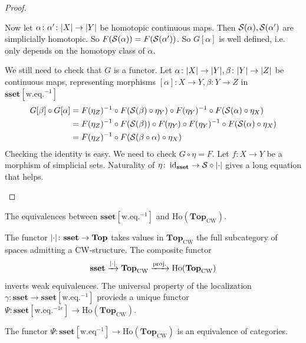 \documentclass[language=english]{TemplateLecture}
\begin{document}
\begin{proof}
\begin{description}
        Now let \(\alpha\colon \alpha' \colon \lvert X\rvert\to \lvert Y\rvert\) be homotopic continuous maps. Then \(\mathcal{S}(\alpha), \mathcal{S}(\alpha')\) are simplicially homotopic. So \(F(\mathcal{S}(\alpha)) = F(\mathcal{S}(\alpha'))\). So \(G[\alpha]\) is well defined, i.e. only depends on the homotopy class of \(\alpha\).

        We still need to check that \(G\) is a functor. Let \(\alpha\colon \lvert X\rvert \to \lvert Y\rvert, \beta\colon \lvert Y\rvert\to \lvert Z\rvert\) be continuous maps, representing morphisms \([\alpha]\colon X\to Y, \beta \colon Y\to Z\) in \(\mathbf{sset}[\mathrm{w.eq.}^{-1}]\)
        \[\begin{split}
            G[\beta]\circ G[\alpha] &= F(\eta_Z)^{-1} \circ F(\mathcal{S}(\beta)\circ \eta_Y) \circ F(\eta_Y)^{-1} \circ F(\mathcal{S}(\alpha)\circ \eta_X) \\
            &= F(\eta_Z)^{-1} \circ F(\mathcal{S}(\beta))\circ F(\eta_Y) \circ F(\eta_Y)^{-1} \circ F(\mathcal{S}(\alpha)\circ \eta_X) \\
            &= F(\eta_Z)^{-1} \circ F(\mathcal{S}(\beta\circ \alpha)\circ \eta_X) \\
        \end{split}\]
        Checking the identity is easy. We need to check \(G\circ \eta = F\). Let \(f\colon X \to Y\) be a morphism of simplicial sets. Naturality of \(\eta\colon \operatorname{id}_{\mathbf{sset}} \to \mathcal{S} \circ \lvert\cdot\rvert\) gives a long equation that helps.
    \end{description}
\end{proof}

The equivalences between \(\mathbf{sset}[\mathrm{w.eq.}^{-1}]\) and \(\mathrm{Ho}(\mathbf{Top}_{\mathrm{CW}})\).

The functor \(\lvert\cdot\rvert\colon \mathbf{sset}\to \mathbf{Top}\) takes values in \(\mathbf{Top}_{\mathrm{CW}}\) the full subcategory of spaces admitting a CW-structure. The composite functor
\[\mathbf{sset}\xrightarrow{\lvert\cdot\rvert} \mathbf{Top}_{\mathrm{CW}} \xrightarrow{\text{proj.}} \mathrm{Ho}(\mathbf{Top}_{\mathrm{CW}})\]
inverts weak equivalences. The universal property of the localization \(\gamma\colon \mathbf{sset} \to \mathbf{sset}[\mathrm{w.eq.}^{-1}]\) provieds a unique functor \(\Psi\colon \mathbf{sset}[\mathrm{w.eq.}^{-1e}] \to \mathrm{Ho}(\mathbf{Top}_{\mathrm{CW}})\).

\begin{thm}{}{}
    The functor \(\Psi\colon \mathbf{sset}[\mathrm{w.eq}^{-1}] \to \mathrm{Ho}(\mathbf{Top}_{\mathrm{CW}})\) is an equivalence of categories.
\end{thm}
\end{document}
